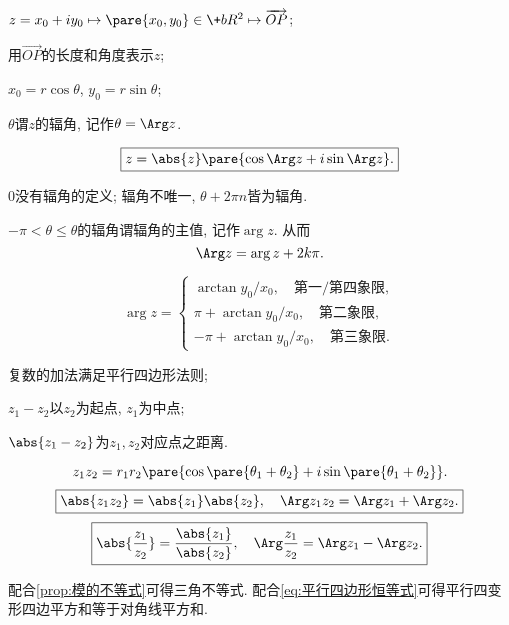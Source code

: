 \documentclass[../ComplexVariable.tex]{subfiles}
\begin{document}
\begin{figure}[ht]
    \centering
\end{figure}
\begin{cenum}
    \item $z = x_0 + iy_0 \mapsto \pare{x_0,y_0}\in\+bR^2\mapsto \overrightarrow{OP}$;
    \item 用$\overrightarrow{OP}$的长度和角度表示$z$;
    \item $x_0 = r\cos\theta$, $y_0 = r\sin\theta$;
    \item $\theta$谓$z$的辐角, 记作$\theta = \Arg z$.
\end{cenum}
\[ \boxed{ z = \abs{z}\pare{\cos\Arg z + i\sin\Arg z}.} \]
\begin{remark}
    $0$没有辐角的定义; 辐角不唯一, $\theta + 2\pi n$皆为辐角.
\end{remark}
\begin{definition}
    $-\pi < \theta \le \theta$的辐角谓辐角的主值, 记作$\arg z$. 从而
    \[ \Arg z = \arg z + 2k\pi. \]
\end{definition}
\begin{lemma}
    \[ \arg z = \begin{cases}
        \arctan y_0/x_0,\quad \text{第一/第四象限},\\
        \pi + \arctan y_0/x_0,\quad \text{第二象限},\\
        -\pi + \arctan y_0/x_0,\quad \text{第三象限}.
    \end{cases} \]
\end{lemma}
\begin{figure}[ht]
    \centering
\end{figure}
\begin{figure}[ht]
    \centering
\end{figure}
\begin{cenum}
    \item 复数的加法满足平行四边形法则;
    \item $z_1-z_2$以$z_2$为起点, $z_1$为中点;
    \item $\abs{z_1-z_2}$为$z_1,z_2$对应点之距离.
\end{cenum}
\begin{theorem}
    \[ z_1z_2 = r_1r_2\pare{\cos\pare{\theta_1+\theta_2} + i\sin\pare{\theta_1+\theta_2}}. \]
    \[ \boxed{\abs{z_1z_2} = \abs{z_1}\abs{z_2},\quad \Arg z_1z_2 = \Arg z_1 + \Arg z_2.} \]
    \[ \boxed{\abs{\frac{z_1}{z_2}} = \frac{\abs{z_1}}{\abs{z_2}},\quad \Arg \frac{z_1}{z_2} = \Arg z_1 - \Arg z_2.} \]
\end{theorem}
\begin{remark}
    配合\cref{prop:模的不等式}可得三角不等式. 配合\eqref{eq:平行四边形恒等式}可得平行四变形四边平方和等于对角线平方和.
\end{remark}
\end{document}
